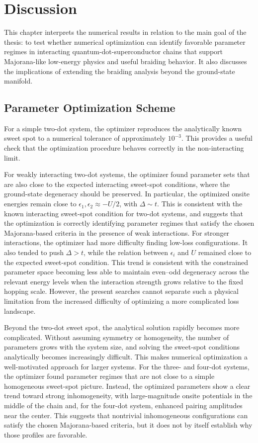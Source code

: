 \chapter{Discussion}
This chapter interprets the numerical results in relation to the main goal of the thesis: to test whether numerical optimization can identify favorable parameter regimes in interacting quantum-dot-superconductor chains that support Majorana-like low-energy physics and useful braiding behavior. It also discusses the implications of extending the braiding analysis beyond the ground-state manifold.

\section{Parameter Optimization Scheme}
For a simple two-dot system, the optimizer reproduces the analytically known sweet spot to a numerical tolerance of approximately \(10^{-3}\). This provides a useful check that the optimization procedure behaves correctly in the non-interacting limit.

For weakly interacting two-dot systems, the optimizer found parameter sets that are also close to the expected interacting sweet-spot conditions, where the ground-state degeneracy should be preserved. In particular, the optimized onsite energies remain close to $\epsilon_1,\epsilon_2 \approx -U/2$, with $\Delta \sim t$. This is consistent with the known interacting sweet-spot condition for two-dot systems, and suggests that the optimization is correctly identifying parameter regimes that satisfy the chosen Majorana-based criteria in the presence of weak interactions. For stronger interactions, the optimizer had more difficulty finding low-loss configurations. It also tended to push $\Delta > t$, while the relation between $\epsilon_i$ and $U$ remained close to the expected sweet-spot condition. This trend is consistent with the constrained parameter space becoming less able to maintain even--odd degeneracy across the relevant energy levels when the interaction strength grows relative to the fixed hopping scale. However, the present searches cannot separate such a physical limitation from the increased difficulty of optimizing a more complicated loss landscape.

Beyond the two-dot sweet spot, the analytical solution rapidly becomes more complicated. Without assuming symmetry or homogeneity, the number of parameters grows with the system size, and solving the sweet-spot conditions analytically becomes increasingly difficult. This makes numerical optimization a well-motivated approach for larger systems. For the three- and four-dot systems, the optimizer found parameter regimes that are not close to a simple homogeneous sweet-spot picture. Instead, the optimized parameters show a clear trend toward strong inhomogeneity, with large-magnitude onsite potentials in the middle of the chain and, for the four-dot system, enhanced pairing amplitudes near the center. This suggests that nontrivial inhomogeneous configurations can satisfy the chosen Majorana-based criteria, but it does not by itself establish why those profiles are favorable.

